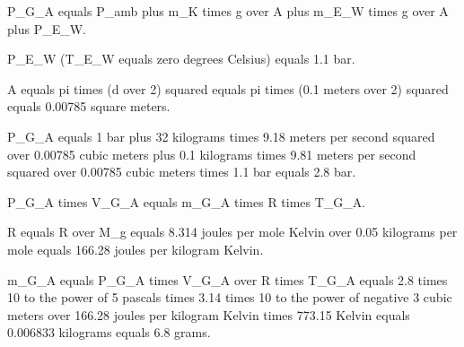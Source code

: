 P_G_A equals P_amb plus m_K times g over A plus m_E_W times g over A plus P_E_W.

P_E_W (T_E_W equals zero degrees Celsius) equals 1.1 bar.

A equals pi times (d over 2) squared equals pi times (0.1 meters over 2) squared equals 0.00785 square meters.

P_G_A equals 1 bar plus 32 kilograms times 9.18 meters per second squared over 0.00785 cubic meters plus 0.1 kilograms times 9.81 meters per second squared over 0.00785 cubic meters times 1.1 bar equals 2.8 bar.

P_G_A times V_G_A equals m_G_A times R times T_G_A.

R equals R over M_g equals 8.314 joules per mole Kelvin over 0.05 kilograms per mole equals 166.28 joules per kilogram Kelvin.

m_G_A equals P_G_A times V_G_A over R times T_G_A equals 2.8 times 10 to the power of 5 pascals times 3.14 times 10 to the power of negative 3 cubic meters over 166.28 joules per kilogram Kelvin times 773.15 Kelvin equals 0.006833 kilograms equals 6.8 grams.